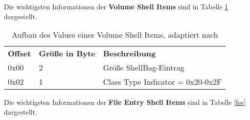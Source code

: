Die wichtigsten Informationen der \textbf{Volume Shell Items} sind in Tabelle \ref{volume} dargestellt.

\begin{longtable}{|p{}|p{}|p{}|}
	\caption{Aufbau des Values eines Volume Shell Items, adaptiert nach \cite{shelltype}} \label{volume} \vspace{1em} \\
	\hline
	\cellcolor{gray!25}\textbf{Offset} & \cellcolor{gray!25}\textbf{Größe in Byte} & \cellcolor{gray!25}\textbf{Beschreibung} \\
	\hline
	0x00 & 2 & Größe ShellBag-Eintrag\\
	\hline
	0x02 & 1 & Class Type Indicator = 0x20-0x2F \\
	\hline
\end{longtable}
\vspace{1em}
Die wichtigsten Informationen der \textbf{File Entry Shell Items} sind in Tabelle \ref{fes} dargestellt.

